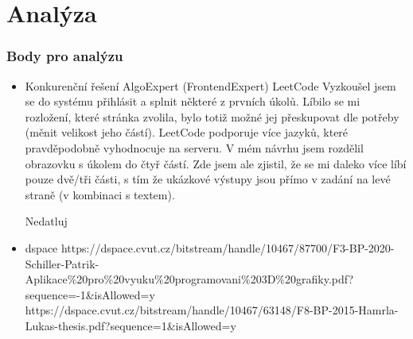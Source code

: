 
\chapter{Analýza}

\subsection{Body pro analýzu}
\begin{itemize}
    \item Konkurenční řešení
    \subitem AlgoExpert (FrontendExpert)
    \subitem LeetCode
    Vyzkoušel jsem se do systému přihlásit a splnit některé z prvních úkolů. Líbilo se mi rozložení, které stránka zvolila,
    bylo totiž možné jej přeskupovat dle potřeby (měnit velikost jeho částí). LeetCode podporuje více jazyků, které pravděpodobně
    vyhodnocuje na serveru. V mém návrhu jsem rozdělil obrazovku s úkolem do čtyř částí. Zde jsem ale zjistil, že se mi daleko
    více líbí pouze dvě/tři části, s tím že ukázkové výstupy jsou přímo v zadání na levé straně (v kombinaci s textem).

    \subitem Nedatluj
    \item dspace
    \subitem https://dspace.cvut.cz/bitstream/handle/10467/87700/F3-BP-2020-Schiller-Patrik-Aplikace\%20pro\%20vyuku\%20programovani\%203D\%20grafiky.pdf?sequence=-1\&isAllowed=y
    \subitem https://dspace.cvut.cz/bitstream/handle/10467/63148/F8-BP-2015-Hamrla-Lukas-thesis.pdf?sequence=1\&isAllowed=y
\end{itemize}

